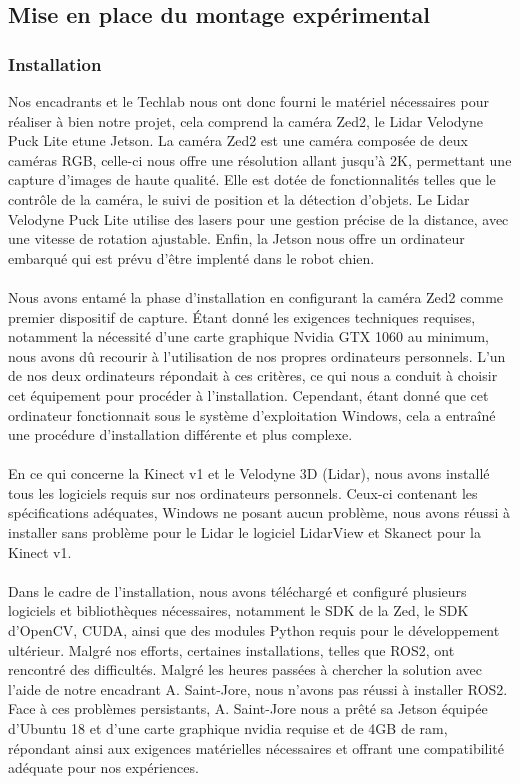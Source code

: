 \subsection{Mise en place du montage expérimental}
    \subsubsection{Installation}
        \normalsize{
            Nos encadrants et le Techlab nous ont donc fourni le matériel nécessaires pour réaliser à bien notre projet, cela comprend la caméra Zed2, le Lidar Velodyne Puck Lite etune Jetson. La caméra Zed2 est une caméra composée de deux caméras RGB, celle-ci nous offre une résolution allant jusqu'à 2K, permettant une capture d'images de haute qualité. Elle est dotée de fonctionnalités telles que le contrôle de la caméra, le suivi de position et la détection d'objets. Le Lidar Velodyne Puck Lite utilise des lasers pour une gestion précise de la distance, avec une vitesse de rotation ajustable. Enfin, la Jetson nous offre un ordinateur embarqué qui est prévu d'être implenté dans le robot chien.
        }
        \\ \\
        \normalsize{
            Nous avons entamé la phase d'installation en configurant la caméra Zed2 comme premier dispositif de capture. Étant donné les exigences techniques requises, notamment la nécessité d'une carte graphique Nvidia GTX 1060 au minimum, nous avons dû recourir à l'utilisation de nos propres ordinateurs personnels. L'un de nos deux ordinateurs répondait à ces critères, ce qui nous a conduit à choisir cet équipement pour procéder à l'installation. Cependant, étant donné que cet ordinateur fonctionnait sous le système d'exploitation Windows, cela a entraîné une procédure d'installation différente et plus complexe.
        }
        \\ \\
        \normalsize{
            En ce qui concerne la Kinect v1 et le Velodyne 3D (Lidar), nous avons installé tous les logiciels requis sur nos ordinateurs personnels. Ceux-ci contenant les spécifications adéquates, Windows ne posant aucun problème, nous avons réussi à installer sans problème pour le Lidar le logiciel LidarView \cite{lidarview} et Skanect \cite{skanect} pour la Kinect v1.
        }
        \\ \\
        \normalsize{
            Dans le cadre de l'installation, nous avons téléchargé et configuré plusieurs logiciels et bibliothèques nécessaires, notamment le SDK de la Zed, le SDK d'OpenCV, CUDA, ainsi que des modules Python requis pour le développement ultérieur. Malgré nos efforts, certaines installations, telles que ROS2, ont rencontré des difficultés. Malgré les heures passées à chercher la solution avec l'aide de notre encadrant A. Saint-Jore, nous n'avons pas réussi à installer ROS2. Face à ces problèmes persistants, A. Saint-Jore nous a prêté sa Jetson équipée d'Ubuntu 18 et d'une carte graphique nvidia requise et de 4GB de ram, répondant ainsi aux exigences matérielles nécessaires et offrant une compatibilité adéquate pour nos expériences.
        }
    
